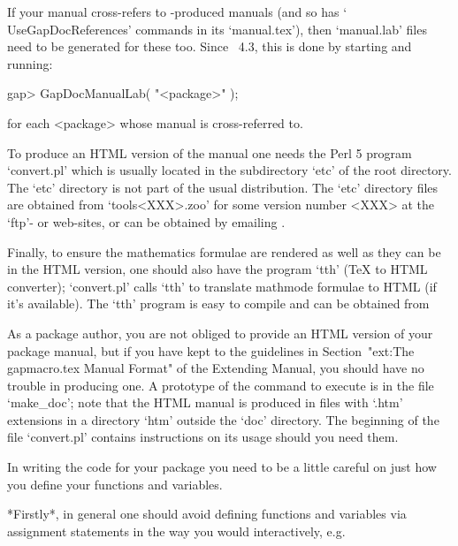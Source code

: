 If your manual cross-refers to -produced manuals (and  so
has  `\\UseGapDocReferences'  commands   in   its   `manual.tex'),   then
`manual.lab' files need to be generated for these too. Since  {\GAP}~4.3,
this is done by starting {\GAP} and running:

gap> GapDocManualLab( "<package>" );

for each <package> whose manual is cross-referred to.

To produce an HTML version of the manual one needs  the  Perl  5  program
`convert.pl' which is usually located in the subdirectory  `etc'  of  the
{\GAP} root directory. The `etc' directory  is  not  part  of  the  usual
{\GAP}  distribution.  The  `etc'  directory  files  are  obtained   from
`tools<XXX>.zoo' for some version number <XXX> at the  {\GAP}  `ftp'-  or
web-sites,      or      can      be      obtained       by       emailing
.

Finally, to ensure the mathematics formulae are rendered as well as  they
can be in the HTML version,  one  should  also  have  the  program  `tth'
({\TeX}  to  HTML  converter);  `convert.pl'  calls  `tth'  to  translate
mathmode formulae to HTML (if it's available). The `tth' program is  easy
to compile and can be obtained from

As a package author, you are not obliged to provide an  HTML  version  of
your  package  manual,  but  if  you  have  kept  to  the  guidelines  in
Section~"ext:The gapmacro.tex Manual  Format"  of  the  Extending  {\GAP}
Manual, you should have no trouble in producing one. A prototype  of  the
command to execute is in the file `make_doc'; note that the  HTML  manual
is produced in files with `.htm' extensions in a directory `htm'  outside
the `doc' directory. The beginning  of  the  file  `convert.pl'  contains
instructions on its usage should you need them.


In writing the {\GAP} code for your package  you  need  to  be  a  little
careful on just how you define your functions and variables.

*Firstly*, in general one should avoid defining functions  and  variables
via assignment statements in the way you would interactively, e.g.

